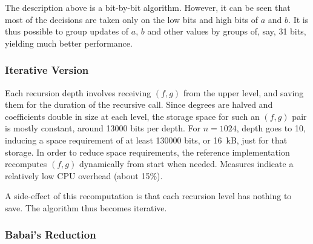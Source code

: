 The description above is a bit-by-bit algorithm. However, it can be seen
that most of the decisions are taken only on the low bits and high bits
of $a$ and $b$. It is thus possible to group updates of $a$, $b$ and
other values by groups of, say, 31 bits, yielding much better
performance.

\subsubsection{Iterative Version}

Each recursion depth involves receiving $(f,g)$ from the upper level,
and saving them for the duration of the recursive call. Since degrees
are halved and coefficients double in size at each level, the storage
space for such an $(f,g)$ pair is mostly constant, around 13000 bits per
depth. For $n = 1024$, depth goes to 10, inducing a space requirement of
at least 130000 bits, or 16~kB, just for that storage. In order to
reduce space requirements, the \falcon reference implementation
recomputes $(f,g)$ dynamically from start when needed. Measures
indicate a relatively low CPU overhead (about 15\%).

A side-effect of this recomputation is that each recursion level
has nothing to save. The algorithm thus becomes iterative.

\subsubsection{Babai's Reduction}


